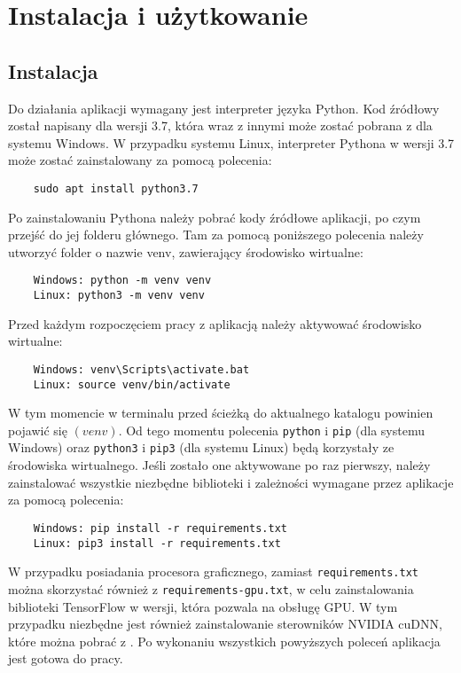 \chapter{Instalacja i użytkowanie}
\thispagestyle{chapterBeginStyle}
\label{chapter6}


\section{Instalacja}
Do działania aplikacji wymagany jest interpreter języka Python. Kod źródłowy został napisany dla wersji 3.7, która wraz z innymi może zostać pobrana z \cite{PythonDownload} dla systemu Windows. W przypadku systemu Linux, interpreter Pythona w wersji 3.7 może zostać zainstalowany za pomocą polecenia:
\begin{verbatim}
    sudo apt install python3.7
\end{verbatim}

Po zainstalowaniu Pythona należy pobrać kody źródłowe aplikacji, po czym przejść do jej folderu głównego. Tam za pomocą poniższego polecenia należy utworzyć folder o nazwie venv, zawierający środowisko wirtualne:
\begin{verbatim}
    Windows: python -m venv venv
    Linux: python3 -m venv venv
\end{verbatim}
Przed każdym rozpoczęciem pracy z aplikacją należy aktywować środowisko wirtualne:
\begin{verbatim}
    Windows: venv\Scripts\activate.bat
    Linux: source venv/bin/activate
\end{verbatim}
W tym momencie w terminalu przed ścieżką do aktualnego katalogu powinien pojawić się $(venv)$. Od tego momentu polecenia \verb|python| i \verb|pip| (dla systemu Windows) oraz \verb|python3| i \verb|pip3| (dla systemu Linux) będą korzystały ze środowiska wirtualnego. Jeśli zostało one aktywowane po raz pierwszy, należy zainstalować wszystkie niezbędne biblioteki i zależności wymagane przez aplikacje za pomocą polecenia:
\begin{verbatim}
    Windows: pip install -r requirements.txt
    Linux: pip3 install -r requirements.txt
\end{verbatim}
W przypadku posiadania procesora graficznego, zamiast \verb|requirements.txt| można skorzystać również z \verb|requirements-gpu.txt|, w celu zainstalowania biblioteki TensorFlow w wersji, która pozwala na obsługę GPU. W tym przypadku niezbędne jest również zainstalowanie sterowników NVIDIA cuDNN, które można pobrać z \cite{cuDNN}. Po wykonaniu wszystkich powyższych poleceń aplikacja jest gotowa do pracy.


